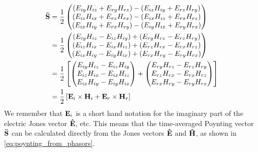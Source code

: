 \begin{subequations}
\begin{align}
    \mathbf{\bar{S}}
    &= \frac{1}{2}
    \begin{pmatrix}
        (E_{iy}H_{iz} + E_{ry}H_{rz}) -
        (E_{iz}H_{iy} + E_{rz}H_{ry})
        \\
        (E_{iz}H_{ix} + E_{rz}H_{rx}) -
        (E_{ix}H_{iz} + E_{rx}H_{rz})
        \\
        (E_{ix}H_{iy} + E_{rx}H_{ry}) -
        (E_{iy}H_{ix} + E_{ry}H_{rx})
    \end{pmatrix}
    \label{eq:poynting_average_detail_0}
    \\
    &= \frac{1}{2}
    \begin{pmatrix}
        (E_{iy}H_{iz} - E_{iz}H_{iy}) + 
        (E_{ry}H_{rz} - E_{rz}H_{ry})
        \\
        (E_{iz}H_{ix} - E_{ix}H_{iz}) + 
        (E_{rz}H_{rx} - E_{rx}H_{rz})
        \\
        (E_{ix}H_{iy} - E_{iy}H_{ix}) +
        (E_{rx}H_{ry} - E_{ry}H_{rx})
    \end{pmatrix}
    \label{eq:poynting_average_detail_1}
    \\
    &= \frac{1}{2}
    \left[
    \begin{pmatrix}
        E_{iy}H_{iz} - E_{iz}H_{iy} \\
        E_{iz}H_{ix} - E_{ix}H_{iz} \\
        E_{ix}H_{iy} - E_{iy}H_{ix} 
    \end{pmatrix}
    +
    \begin{pmatrix}
        E_{ry}H_{rz} - E_{rz}H_{ry} \\
        E_{rz}H_{rx} - E_{rx}H_{rz} \\
        E_{rx}H_{ry} - E_{ry}H_{rx}        
    \end{pmatrix}
    \right]
    \label{eq:poynting_average_detail_2}
    \\
    &= \frac{1}{2}
    \left[
        \mathbf{E}_i \times \mathbf{H}_i
    +
        \mathbf{E}_r \times \mathbf{H}_r
    \right]
    \label{eq:poynting_average_detail_3}
\end{align}
\end{subequations}
We remember that $\mathbf{E}_i$ is a short hand notation for the imaginary part of the electric Jones vector $\mathbf{\hat{E}}$, etc.
This means that the time-averaged Poynting vector $\mathbf{\bar{S}}$ can be calculated directly from the Jones vectors $\mathbf{\hat{E}}$ and $\mathbf{\hat{H}}$, as shown in \cref{eq:poynting_from_phasors}.
